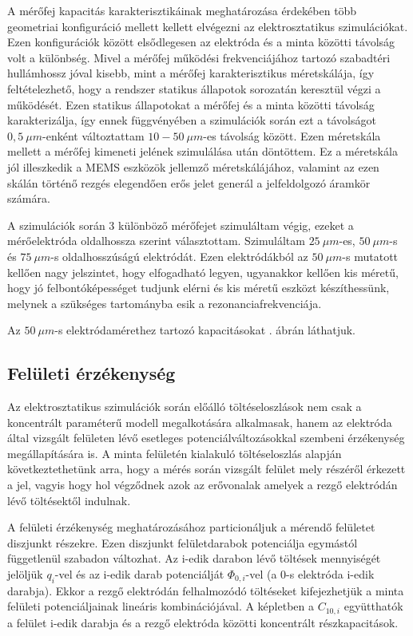 A mérőfej kapacitás karakterisztikáinak meghatározása érdekében több geometriai konfiguráció mellett kellett elvégezni az elektrosztatikus szimulációkat. Ezen konfigurációk között elsődlegesen az elektróda és a minta közötti távolság volt a különbség. Mivel a mérőfej működési frekvenciájához tartozó szabadtéri hullámhossz jóval kisebb, mint a mérőfej karakterisztikus méretskálája, így feltételezhető, hogy a rendszer statikus állapotok sorozatán keresztül végzi a működését. Ezen statikus állapotokat a mérőfej és a minta közötti távolság karakterizálja, így ennek függvényében a szimulációk során ezt a távolságot $0,5\ \mu m$-enként változtattam $10 - 50\ \mu m$-es távolság között. Ezen méretskála mellett a mérőfej kimeneti jelének szimulálása után döntöttem. Ez a méretskála jól illeszkedik a MEMS eszközök jellemző méretskálájához, valamint az ezen skálán történő rezgés elegendően erős jelet generál a jelfeldolgozó áramkör számára.

A szimulációk során 3 különböző mérőfejet szimuláltam végig, ezeket a mérőelektróda oldalhossza szerint választottam. Szimuláltam $25\ \mu m$-es, $50\ \mu m$-s és  $75\ \mu m$-s oldalhosszúságú elektródát. Ezen elektródákból az $50\ \mu m$-s mutatott kellően nagy jelszintet, hogy elfogadható legyen, ugyanakkor kellően kis méretű, hogy jó felbontóképességet tudjunk elérni és kis méretű eszközt készíthessünk, melynek a szükséges tartományba esik a rezonanciafrekvenciája.

Az $50\ \mu m$-s elektródamérethez tartozó kapacitásokat . ábrán láthatjuk.


\subsection{Felületi érzékenység}
\label{sec:sensitivity}

Az elektrosztatikus szimulációk során előálló töltéseloszlások nem csak a koncentrált paraméterű modell megalkotására alkalmasak, hanem az elektróda által vizsgált felületen lévő esetleges potenciálváltozásokkal szembeni érzékenység megállapítására is. A minta felületén kialakuló töltéseloszlás alapján következtethetünk arra, hogy a mérés során vizsgált felület mely részéről érkezett a jel, vagyis hogy hol végződnek azok az erővonalak amelyek a rezgő elektródán lévő töltésektől indulnak.

A felületi érzékenység meghatározásához particionáljuk a mérendő felületet diszjunkt részekre. Ezen diszjunkt felületdarabok potenciálja egymástól függetlenül szabadon változhat. Az i-edik darabon lévő töltések mennyiségét jelöljük $q_i$-vel és az i-edik darab potenciálját $\Phi_{0,i}$-vel (a 0-s elektróda i-edik darabja). Ekkor a rezgő elektródán felhalmozódó töltéseket kifejezhetjük a minta felületi potenciáljainak lineáris kombinációjával. A képletben a $C_{10,i}$ együtthatók a felület i-edik darabja és a rezgő elektróda közötti koncentrált részkapacitások.


